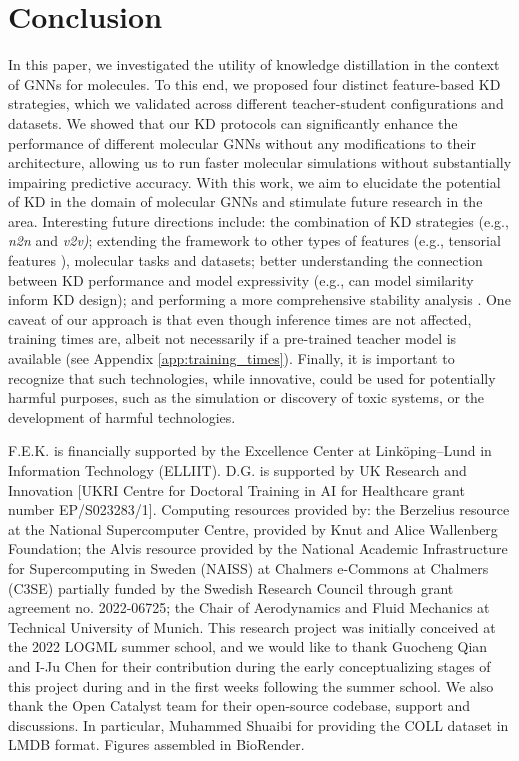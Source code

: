 \documentclass{article}
\begin{document}
\section{Conclusion}
In this paper, we investigated the utility of knowledge distillation in the context of GNNs for molecules. To this end, we proposed four distinct feature-based KD strategies, which we validated across different teacher-student configurations and datasets. We showed that our KD protocols can significantly enhance the performance of different molecular GNNs without any modifications to their architecture, allowing us to run faster molecular simulations without substantially impairing predictive accuracy. 
% 
With this work, we aim to elucidate the potential of KD in the domain of molecular GNNs and stimulate future research in the area. Interesting future directions include: the combination of KD strategies (e.g., \emph{n2n} and \emph{v2v)}; extending the framework to other types of features (e.g., tensorial features \cite{geiger2022e3nn}), molecular tasks and datasets; better understanding the connection between KD performance and model expressivity (e.g., can model similarity inform KD design); and performing a more comprehensive stability analysis \cite{fu2022forces}.
% 
One caveat of our approach is that even though inference times are not affected, training times are, albeit not necessarily if a pre-trained teacher model is available (see Appendix \ref{app:training_times}).
% 
Finally, it is important to recognize that such technologies, while innovative, could be used for potentially harmful purposes, such as the simulation or discovery of toxic systems, or the development of harmful technologies.

\begin{ack} %
F.E.K. is financially supported by the Excellence Center at Linköping--Lund in Information Technology (ELLIIT). 
% 
D.G. is supported by UK Research and Innovation [UKRI Centre for Doctoral Training in AI for Healthcare grant number EP/S023283/1].
Computing resources provided by: the Berzelius resource at the National Supercomputer Centre, provided by Knut and Alice Wallenberg Foundation; the Alvis resource provided by the National Academic Infrastructure for Supercomputing in Sweden (NAISS) at Chalmers e-Commons at Chalmers (C3SE) partially funded by the Swedish Research Council through grant agreement no. 2022-06725; the Chair of Aerodynamics and Fluid Mechanics at Technical University of Munich. 
This research project was initially conceived at the 2022 LOGML summer school, and we would like to thank Guocheng Qian and I-Ju Chen for their contribution during the early conceptualizing stages of this project during and in the first weeks following the summer school. 
We also thank the Open Catalyst team for their open-source codebase, support and discussions. In particular, Muhammed Shuaibi for providing the COLL dataset in LMDB format.
Figures assembled in BioRender.

\end{ack}
\end{document}
